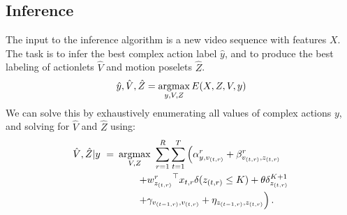 \subsection{Inference}
\label{subsec:inference}
The input to the inference algorithm is a new video sequence with features
$X$. The task is to infer the best complex action label $\hat y$, and to 
produce the best labeling of actionlets $\hat V$ and motion poselets $\hat Z$.
\begin{equation}
  \hat y, \hat V, \hat Z = \operatorname*{argmax}_{y, V, Z} E(X, Z, V, y)
\end{equation}
We can solve this by exhaustively enumerating all values of complex actions $y$, and solving for $\hat{V}$ and $\hat{Z}$ using:
\begin{equation}
\begin{split}
 \hat{V}, \hat{Z} | y ~ =~ &   \argmax_{V,Z} ~   \sum_{r=1}^R \sum_{t=1}^T \left( \alpha^r_{y,v_{(t,r)}} 
                  + \beta^r_{v_{(t,r)},z_{(t,r)}}\right. \\
				&\quad\quad \left.+ {w^r_{z_{(t,r)}}}^\top x_{t,r} \delta(z_{(t,r)} \le K)  + \theta \delta_{z_{(t,r)}}^{K+1} \right. \\ 
				& \quad\quad \left.+ \gamma_{v_{({t-1},r)},v_{(t,r)}} + \eta_{z_{({t-1},r)},z_{(t,r)}}  \vphantom{{w^r_{z_{(t,r)}}}^\top x_{t,r}} \right). \\
\end{split}
\label{eq:classify_inference}
\end{equation}
